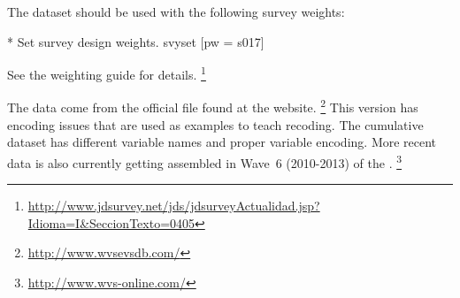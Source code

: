 The \WVS dataset should be used with the following survey weights:

\begin{docspec}
  * Set survey design weights.
	svyset [pw = s017]
\end{docspec}

See the \WVS weighting guide for details.%
  \footnote{\url{http://www.jdsurvey.net/jds/jdsurveyActualidad.jsp?Idioma=I&SeccionTexto=0405}}

The data come from the official file found at the \WVS website.%
   \footnote{\url{http://www.wvsevsdb.com/}} %
   This version has encoding issues that are used as examples to teach recoding. The cumulative dataset has different variable names and proper variable encoding. More recent data is also currently getting assembled in Wave~6 (2010-2013) of the \wvs.%
  \footnote{\url{http://www.wvs-online.com/}}
